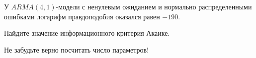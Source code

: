 
\begin{question}
У \(ARMA(4, 1)\)-модели с ненулевым ожиданием и нормально распределенными ошибками логарифм правдоподобия оказался равен \(-190\).

Найдите значение информационного критерия Акаике.
\end{question}

\begin{solution}
Не забудьте верно посчитать число параметров!
\end{solution}

